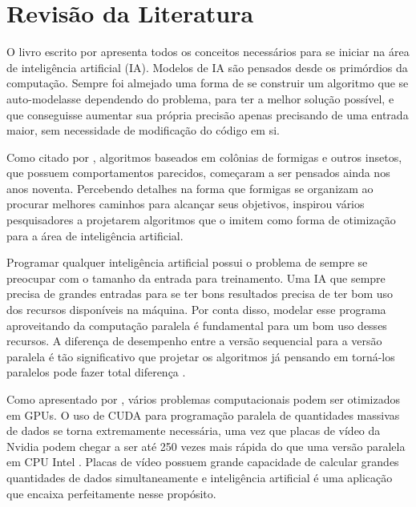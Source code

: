 \section{Revisão da Literatura}

O livro escrito por \citeauthor{BookIA} \cite{BookIA} apresenta todos os conceitos necessários para se iniciar na área de inteligência artificial (IA).
Modelos de IA são pensados desde os primórdios da computação. Sempre foi almejado uma forma de se construir um algoritmo
que se auto-modelasse dependendo do problema, para ter a melhor solução possível,
e que conseguisse aumentar sua própria precisão apenas precisando de uma entrada maior, sem necessidade de modificação
do código em si.

Como citado por \citeauthor{AntColonyOptimization} \cite{AntColonyOptimization}, algoritmos baseados em colônias de formigas
e outros insetos, que possuem comportamentos parecidos, começaram a ser pensados ainda nos anos noventa. 
Percebendo detalhes na forma que formigas se organizam ao procurar melhores
caminhos para alcançar seus objetivos, inspirou vários pesquisadores a projetarem algoritmos que o imitem como forma
de otimização para a área de inteligência artificial.

Programar qualquer inteligência artificial possui o problema de sempre se preocupar com o tamanho da entrada para treinamento.
Uma IA que sempre precisa de grandes entradas para se ter bons resultados precisa de ter bom uso dos recursos disponíveis na máquina. 
Por conta disso, modelar esse programa aproveitando da computação paralela é fundamental para um bom uso desses recursos. 
A diferença de desempenho entre a versão sequencial para a versão paralela é tão significativo que projetar os algoritmos 
já pensando em torná-los paralelos pode fazer total diferença \cite{SequentialVSParallel}.

Como apresentado por \citeauthor{ParallelComputingCUDA}, vários problemas computacionais podem ser otimizados em GPUs.
O uso de CUDA para programação paralela de quantidades massivas de dados se torna extremamente necessária, uma vez que
placas de vídeo da Nvidia podem chegar a ser até 250 vezes mais rápida do que uma versão paralela em CPU Intel \cite{ParallelComputingCUDA}. 
Placas de vídeo possuem grande capacidade de calcular grandes quantidades de dados simultaneamente e inteligência artificial 
é uma aplicação que encaixa perfeitamente nesse propósito.